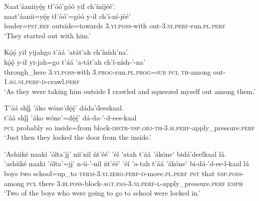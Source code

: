 \ea\label{ex:text1-40-1}
Naat’áaniiyę́ę tł’óó’góó yił ch’íníjéé’.\\
\gll naat’áanii=yę́ę	tł’óó’=góó	y-ił	ch’í-ní-jéé’\\
     leader=\textsc{pst}.\textsc{ref}	outside=towards	3.\textsc{yi}.\textsc{poss}-with	out-3.\textsc{ni}.\textsc{perf}-run.\textsc{pl}.\textsc{perf}\\
\glt `They started out with him.'
\z

\ea\label{ex:text1-40-2}
Kǫ́ǫ́ yił yijahgo t’áá ’atát’ah ch’ínísh’na’.\\
\gll kǫ́ǫ́	y-ił	yi-jah=go	t’áá	’a-tát’ah	ch’í-nísh-’-na’\\
     through\_here	3.\textsc{yi}.\textsc{poss}-with	3.\textsc{prog}-run.\textsc{pl}.\textsc{prog}=\textsc{sub}	\textsc{pcl}	\textsc{th}-among	out-1.\textsc{sg}.\textsc{ni}.\textsc{perf}-\textsc{d}-crawl.\textsc{perf}\\
\glt `As they were taking him outside I crawled and squeezed myself out among them.'
\z

\ea\label{ex:text1-40-3}
T’áá shį́į́ ’áko wóne’dę́ę́’ dáda’deeskaal.\\
\gll t’áá	shį́į́	’áko	wóne’=dę́ę́’	dá-da-’-d-ees-kaal\\
     \textsc{pcl}	probably	so	inside=from	block-\textsc{distr}-\textsc{nsp}.\textsc{obj}-\textsc{th}-3.\textsc{si}.\textsc{perf}-apply\_pressure.\textsc{perf}\\
\glt `Just then they locked the door from the inside.'
\z

\ea\label{ex:text1-40-4}
’Ashiiké naaki ’ólta’jį’ nii’nil ńt’éé’ ’éí ’atah t’áá ’ákóne’ bidá’deelkaal lá.\\
\gll ’ashiiké	naaki	’ólta’=jį’	n-ii-’-nil	ńt’éé’	’éí	’a-tah	t’áá	’ákóne’	bi-dá-’d-ee-l-kaal	lá\\
     boys	two	school=up\_to	\textsc{term}-3.\textsc{yi}.\textsc{zero}.\textsc{perf}-\textsc{d}-move.\textsc{pl}.\textsc{perf}	\textsc{pst}	that	\textsc{nsp}.\textsc{poss}-among	\textsc{pcl}	there	3.\textsc{bi}.\textsc{poss}-block-\textsc{agt}.\textsc{pas}-3.\textsc{ni}.\textsc{perf}-\textsc{l}-apply\_pressure.\textsc{perf}	\textsc{emph}\\
\glt `Two of the boys who were going to go to school were locked in.'
\z

